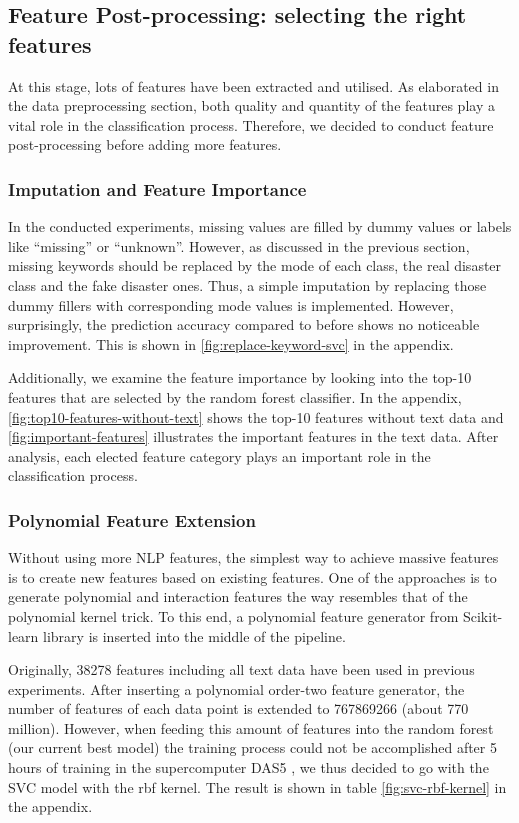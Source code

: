 \subsection{Feature Post-processing: selecting the right features}
At this stage, lots of features have been extracted and utilised.
As elaborated in the data preprocessing section, both quality and quantity of the features play a vital role in the classification process.
Therefore, we decided to conduct feature post-processing  before adding more features.

\subsubsection{Imputation and Feature Importance}

In the conducted experiments, missing values are filled by dummy values or labels like ``missing'' or ``unknown''.
However, as discussed in the previous section, missing keywords should be replaced by the mode of each class, the real disaster class and the fake disaster ones.
Thus, a simple imputation by replacing those dummy fillers with corresponding mode values is implemented.
However, surprisingly, the prediction accuracy compared to before shows no noticeable improvement.
This is shown in \autoref{fig:replace-keyword-svc} in the appendix.

Additionally, we examine the feature importance by looking into the top-10 features that are selected by the random forest classifier.
In the appendix, \autoref{fig:top10-features-without-text} shows the top-10 features without text data and  \autoref{fig:important-features} illustrates the important features in the text data.
After analysis, each elected feature category plays an important role in the classification process.

\subsubsection{Polynomial Feature Extension}

Without using more NLP features, the simplest way to achieve massive features is to create new features based on existing features.
One of the approaches is to generate polynomial and interaction features the way resembles that of the polynomial kernel trick.
To this end, a polynomial feature generator from Scikit-learn library is inserted into the middle of the pipeline.

Originally, 38278 features including all text data have been used in previous experiments.
After inserting a polynomial order-two feature generator, the number of features of each data point is extended to 767869266 (about 770 million).
However, when feeding this amount of features into the random forest (our current best model) the training process could not be accomplished after 5
hours of training in the supercomputer DAS5 \cite{x5}, we thus decided to go with the SVC model with the rbf kernel.
The result is shown in table \autoref{fig:svc-rbf-kernel} in the appendix.

